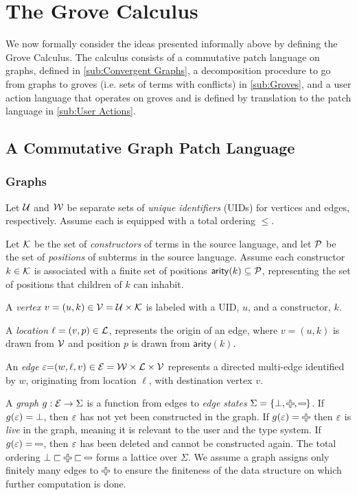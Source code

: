 
\section{The Grove Calculus}%
\label{sec:Formalism}

We now formally consider the ideas presented informally above by defining the Grove Calculus. The calculus consists of a commutative patch language on graphs, defined in \autoref{sub:Convergent Graphs}, a decomposition procedure to go from graphs to groves (i.e. sets of terms with conflicts) in \autoref{sub:Groves}, and a user action language that operates on groves and is defined by translation to the patch language in \autoref{sub:User Actions}.

\subsection{A Commutative Graph Patch Language}%
\label{sub:Convergent Graphs}

\subsubsection{Graphs}
Let $\U$ and $\W$ be separate sets of \emph{unique identifiers} (UIDs) for vertices and edges, respectively. Assume each is equipped with a total ordering $\leq$. 

Let $\K$ be the set of \emph{constructors} of terms in the source language, and let $\P$ be the set of \emph{positions} of subterms in the source language. Assume each constructor $k\in\K$ is associated with a finite set of positions $\mathsf{arity}(k)\subseteq \P$, representing the set of positions that children of $k$ can inhabit.

A \emph{vertex} $v = (u, k) \in \V = \U \times \K$ is labeled with a UID, $u$, and a constructor, $k$. 

A \emph{location} $\ell = (v, p) \in \L$, represents the origin of an edge, where $v=(u,k)$ is drawn from $\V$ and position $p$ is drawn from $\mathsf{arity}(k)$.

An \emph{edge} $\e{=}(w, \ell, v) \in \E = \W \times \L \times \V$ represents a directed multi-edge 
    identified by $w$, 
    originating from location $\ell$, 
    with destination vertex $v$.

A \emph{graph} $g : \E \rightarrow \Sigma$ is a function from edges to \emph{edge states} $\Sigma = \SetOf{\bot, \Plus, \Minus}$. If $g(\e) = \bot$, then $\e$ has not yet been constructed in the graph. If $g(\e) = \Plus$ then $\e$ is \textit{live} in the graph, meaning it is relevant to the user and the type system. If $g(\e) = \Minus$, then $\e$ has been deleted and cannot be constructed again. The total ordering $\bot \sqsubset \Plus \sqsubset \Minus$ forms a lattice over $\Sigma$. We assume a graph assigns only finitely many edges to $\Plus$ to ensure the finiteness of the data structure on which further computation is done.

